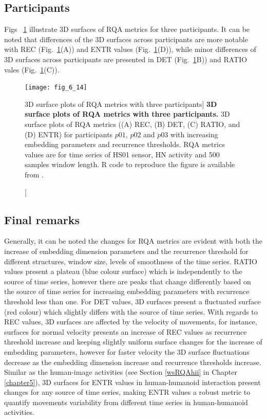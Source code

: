 \subsection{Participants}
Figs ~\ref{fig:topo_participants} illustrate 3D surfaces of RQA metrics for 
three participants.
It can be noted that differences of the 3D surfaces across participants 
are more notable with REC (Fig.~\ref{fig:topo_participants}(A)) and 
ENTR values (Fig.~\ref{fig:topo_participants}(D)),
while minor differences of 3D surfaces across participants are 
presented in
DET (Fig.~\ref{fig:topo_participants}B)) and 
RATIO vales (Fig.~\ref{fig:topo_participants}(C)).
\begin{figure}
\centering
\texttt{[image: fig\_6\_14]}
    \caption
	[3D surface plots of RQA metrics with three participants]{
	{\bf 3D surface plots of RQA metrics with three participants.}
	3D surface plots of RQA metrics ((A) REC, (B) DET, (C) RATIO, and (D) ENTR) 
	for participants $p01$, $p02$ and $p03$ with increasing embedding 
	parameters and recurrence thresholds.
	RQA metrics values are for time series of HS01 sensor, 
	HN activity and 500 samples window length.
	R code to reproduce the figure is available from \cite{hwum2018}.
 }
\label{fig:topo_participants}
\end{figure}

\newpage
\subsection{Final remarks}
Generally, it can be noted the changes for RQA metrics are evident
with both the increase of embedding dimension parameters and the 
recurrence threshold for different structures, window size, 
levels of smoothness of the time series. 
RATIO values present a plateau (blue colour surface) which is independently 
to the source of time series, however there are peaks that change 
differently based on the source of time series for increasing 
embedding parameters  with recurrence threshold less than one.
For DET values, 3D surfaces present a fluctuated surface (red colour)
which slightly differs with the source of time series.
With regards to REC values, 3D surfaces are affected by the velocity
of movements, for instance, surfaces for normal velocity presents 
an increase of REC values as recurrence threshold increase and keeping 
slightly uniform surface changes for the increase of embedding parameters, 
however for faster velocity the 3D surface fluctuations decrease as 
the embedding dimension increase and recurrence thresholds increase.
Similar as the human-image activities  
(see Section \ref{wsRQAhii} in Chapter \ref{chapter5}), 
3D surfaces for ENTR values in human-humanoid interaction  
present changes for any source of time series,
making ENTR values a robust metric to quantify movements variability 
from different time series in human-humanoid activities.

